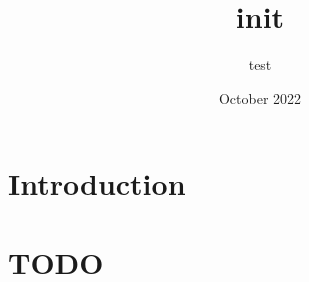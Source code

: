 \documentclass{article}
\title{init}
\author{test}
\date{October 2022}
\begin{document}
\maketitle

\section{Introduction}

\section{TODO}
\end{document}
